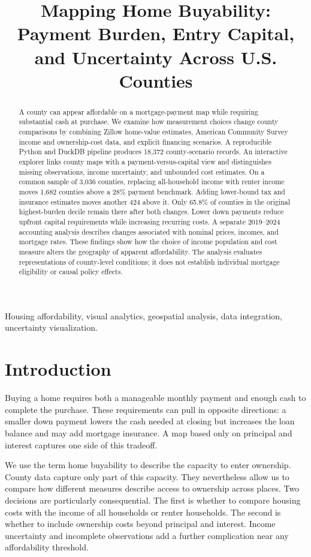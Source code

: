 \documentclass[conference,letterpaper]{IEEEtran}
\title{Mapping Home Buyability: Payment Burden, Entry Capital, and Uncertainty Across U.S. Counties}
\author{
\IEEEauthorblockN{Ankit Hemant Lade}
\IEEEauthorblockA{Ascentt Systems Inc, USA\\
ankitlade12@gmail.com}
\and
\IEEEauthorblockN{Venkata Rao Kondepati}
\IEEEauthorblockA{Ascentt, USA\\
venkata.kondepati@gmail.com}
}
\begin{document}
\maketitle
\thispagestyle{empty}
\begin{abstract}
A county can appear affordable on a mortgage-payment map while requiring substantial cash at purchase. We examine how measurement choices change county comparisons by combining Zillow home-value estimates, American Community Survey income and ownership-cost data, and explicit financing scenarios. A reproducible Python and DuckDB pipeline produces 18,372 county-scenario records. An interactive explorer links county maps with a payment-versus-capital view and distinguishes missing observations, income uncertainty, and unbounded cost estimates. On a common sample of 3,036 counties, replacing all-household income with renter income moves 1,682 counties above a 28\% payment benchmark. Adding lower-bound tax and insurance estimates moves another 424 above it. Only 65.8\% of counties in the original highest-burden decile remain there after both changes. Lower down payments reduce upfront capital requirements while increasing recurring costs. A separate 2019--2024 accounting analysis describes changes associated with nominal prices, incomes, and mortgage rates. These findings show how the choice of income population and cost measure alters the geography of apparent affordability. The analysis evaluates representations of county-level conditions; it does not establish individual mortgage eligibility or causal policy effects.
\end{abstract}
\begin{IEEEkeywords}
Housing affordability, visual analytics, geospatial analysis, data integration, uncertainty visualization.
\end{IEEEkeywords}

\section{Introduction}
Buying a home requires both a manageable monthly payment and enough cash to complete the purchase. These requirements can pull in opposite directions: a smaller down payment lowers the cash needed at closing but increases the loan balance and may add mortgage insurance. A map based only on principal and interest captures one side of this tradeoff.

We use the term home buyability to describe the capacity to enter ownership. County data capture only part of this capacity. They nevertheless allow us to compare how different measures describe access to ownership across places. Two decisions are particularly consequential. The first is whether to compare housing costs with the income of all households or renter households. The second is whether to include ownership costs beyond principal and interest. Income uncertainty and incomplete observations add a further complication near any affordability threshold.
\end{document}
